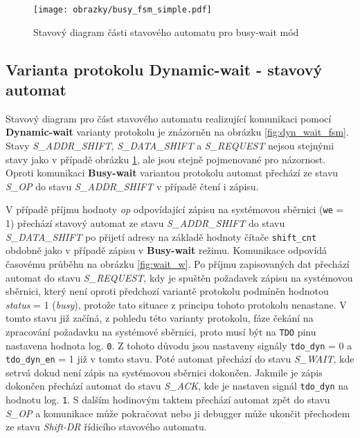 \begin{figure}[H]
  \begin{center}
    \texttt{[image: obrazky/busy\_fsm\_simple.pdf]}
  \end{center}
  \caption{Stavový diagram části stavového automatu pro busy-wait mód}
	\label{fig:busy_wait_fsm}
\end{figure}
\pagebreak

\subsection{Varianta protokolu Dynamic-wait - stavový automat} \label{subsec:dyn-wait-fsm}
Stavový diagram pro část stavového automatu realizující komunikaci pomocí \textbf{Dynamic-wait} varianty protokolu je znázorněn na obrázku \ref{fig:dyn_wait_fsm}. Stavy \textit{S\_ADDR\_SHIFT}, \textit{S\_DATA\_SHIFT} a \textit{S\_REQUEST} nejsou stejnými stavy jako v případě obrázku \ref{fig:busy_wait_fsm}, ale jsou stejně pojmenované pro názornost. Oproti komunikaci \textbf{Busy-wait} variantou protokolu automat přechází ze stavu \textit{S\_OP} do stavu \textit{S\_ADDR\_SHIFT} v případě čtení i zápisu.

V případě příjmu hodnoty \textit{op} odpovídající zápisu na systémovou sběrnici (\texttt{we} = 1) přechází stavový automat ze stavu \textit{S\_ADDR\_SHIFT} do stavu \textit{S\_DATA\_SHIFT} po přijetí adresy na základě hodnoty čítače \texttt{shift\_cnt} obdobně jako v případě zápisu v \textbf{Busy-wait} režimu. Komunikace odpovídá časovému průběhu na obrázku \ref{fig:wait_w}. Po příjmu zapisovaných dat přechází automat do stavu \textit{S\_REQUEST}, kdy je spuštěn požadavek zápisu na systémovou sběrnici, který není oproti předchozí variantě protokolu podmíněn hodnotou \textit{status} = 1 (\textit{busy}), protože tato situace z principu tohoto protokolu nenastane. V tomto stavu již začíná, z pohledu této varianty protokolu, fáze čekání na zpracování požadavku na systémové sběrnici, proto musí být na \texttt{\acs{TDO}} pinu nastavena hodnota log. \texttt{0}. Z tohoto důvodu jsou nastaveny signály \texttt{tdo\_dyn} = 0 a \texttt{tdo\_dyn\_en} = 1 již v tomto stavu. Poté automat přechází do stavu \textit{S\_WAIT}, kde setrvá dokud není zápis na systémovou sběrnici dokončen. Jakmile je zápis dokončen přechází automat do stavu \textit{S\_ACK}, kde je nastaven signál \texttt{tdo\_dyn} na hodnotu log. \texttt{1}. S dalším hodinovým taktem přechází automat zpět do stavu \textit{S\_OP} a komunikace může pokračovat nebo ji debugger může ukončit přechodem ze stavu \textit{Shift-DR} řídicího stavového automatu.

